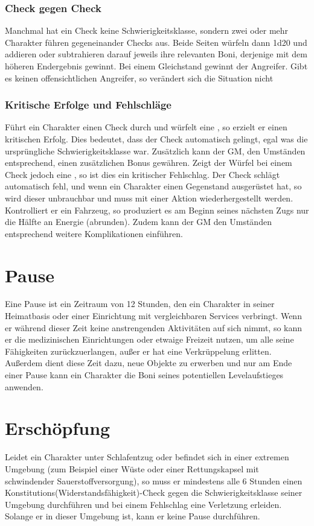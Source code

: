 \subsubsection{Check gegen Check}
Manchmal hat ein Check keine Schwierigkeitsklasse, sondern zwei oder mehr Charakter führen gegeneinander Checks aus. Beide Seiten würfeln dann 1d20 und addieren oder subtrahieren darauf jeweils ihre relevanten Boni, derjenige mit dem höheren Endergebnis gewinnt.
Bei einem Gleichstand gewinnt der Angreifer. Gibt es keinen offensichtlichen Angreifer, so verändert sich die Situation nicht
\subsubsection{Kritische Erfolge und Fehlschläge}
Führt ein Charakter einen Check durch und würfelt eine \grqq{}, so erzielt er einen kritischen Erfolg. Dies bedeutet, dass der Check automatisch gelingt, egal was die ursprüngliche Schwierigkeitsklasse war. Zusätzlich kann der GM, den Umständen entsprechend, einen zusätzlichen Bonus gewähren. Zeigt der Würfel bei einem Check jedoch eine \grqq{}, so ist dies ein kritischer Fehlschlag. Der Check schlägt automatisch fehl, und wenn ein Charakter einen Gegenstand ausgerüstet hat, so wird dieser unbrauchbar und muss mit einer Aktion wiederhergestellt werden. Kontrolliert er ein Fahrzeug, so produziert es am Beginn seines nächsten Zugs nur die Hälfte an Energie (abrunden). Zudem kann der GM den Umständen entsprechend weitere Komplikationen einführen.
\section{Pause}
Eine Pause ist ein Zeitraum von 12 Stunden, den ein Charakter in seiner Heimatbasis oder einer Einrichtung mit vergleichbaren Services verbringt. Wenn er während dieser Zeit keine anstrengenden Aktivitäten auf sich nimmt, so kann er die medizinischen Einrichtungen oder etwaige Freizeit nutzen, um alle seine Fähigkeiten zurückzuerlangen, außer er hat eine Verkrüppelung erlitten. Außerdem dient diese Zeit dazu, neue Objekte zu erwerben und nur am Ende einer Pause kann ein Charakter die Boni seines potentiellen Levelaufstieges anwenden.
\section{Erschöpfung}
Leidet ein Charakter unter Schlafentzug oder befindet sich in einer extremen Umgebung (zum Beispiel einer Wüste oder einer Rettungskapsel mit schwindender Sauerstoffversorgung), so muss er mindestens alle 6 Stunden einen Konstitutions(Widerstandsfähigkeit)-Check gegen die Schwierigkeitsklasse seiner Umgebung durchführen und bei einem Fehlschlag eine Verletzung erleiden. Solange er in dieser Umgebung ist, kann er keine Pause durchführen.

